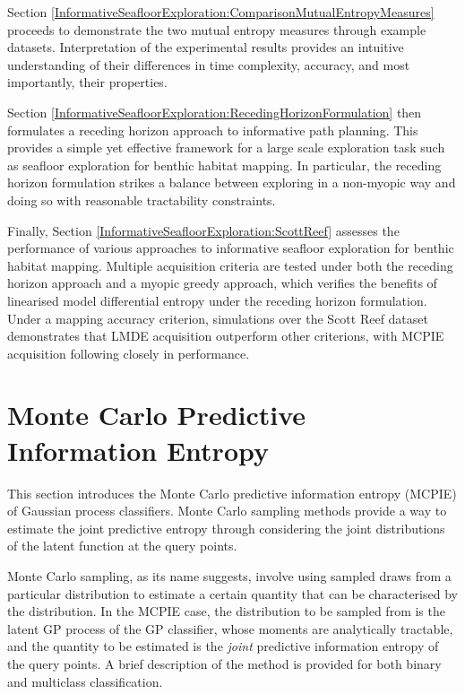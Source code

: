 	Section \ref{InformativeSeafloorExploration:ComparisonMutualEntropyMeasures} proceeds to demonstrate the two mutual entropy measures through example datasets. Interpretation of the experimental results provides an intuitive understanding of their differences in time complexity, accuracy, and most importantly, their properties.
	
	Section \ref{InformativeSeafloorExploration:RecedingHorizonFormulation} then formulates a receding horizon approach to informative path planning. This provides a simple yet effective framework for a large scale exploration task such as seafloor exploration for benthic habitat mapping. In particular, the receding horizon formulation strikes a balance between exploring in a non-myopic way and doing so with reasonable tractability constraints.
	
	Finally, Section \ref{InformativeSeafloorExploration:ScottReef} assesses the performance of various approaches to informative seafloor exploration for benthic habitat mapping. Multiple acquisition criteria are tested under both the receding horizon approach and a myopic greedy approach, which verifies the benefits of linearised model differential entropy under the receding horizon formulation. Under a mapping accuracy criterion, simulations over the Scott Reef dataset demonstrates that LMDE acquisition outperform other criterions, with MCPIE acquisition following closely in performance.
		
	\section{Monte Carlo Predictive Information Entropy}
	\label{InformativeSeafloorExploration:MCPIE}
	
		This section introduces the Monte Carlo predictive information entropy (MCPIE) of Gaussian process classifiers. Monte Carlo sampling methods provide a way to estimate the joint predictive entropy through considering the joint distributions of the latent function at the query points.
	
		Monte Carlo sampling, as its name suggests, involve using sampled draws from a particular distribution to estimate a certain quantity that can be characterised by the distribution. In the MCPIE case, the distribution to be sampled from is the latent GP process of the GP classifier, whose moments are analytically tractable, and the quantity to be estimated is the \textit{joint} predictive information entropy of the query points. A brief description of the method is provided for both binary and multiclass classification.
		
